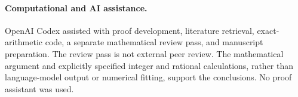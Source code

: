 \documentclass[11pt]{article}
\begin{document}
\paragraph{Computational and AI assistance.}
OpenAI Codex assisted with proof development, literature retrieval,
exact-arithmetic code, a separate mathematical review pass, and
manuscript preparation. The review pass is not external peer review.
The mathematical argument and explicitly specified integer and rational
calculations, rather than language-model output or numerical fitting,
support the conclusions. No proof assistant was used.



\end{document}
